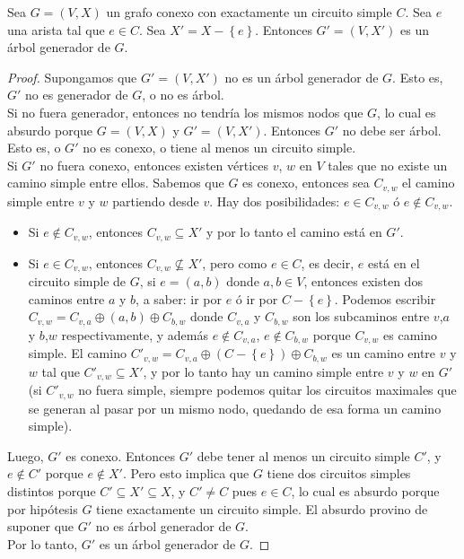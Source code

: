 \begin{lema}
\label{lema_ej3}
Sea $G = (V,X)$ un grafo conexo con exactamente un circuito simple $C$. Sea $e$ una arista tal que $e \in C$. Sea $X' = X - \left\{e\right\}$. Entonces $G' = (V,X')$ es un árbol generador de $G$.
\end{lema}
\begin{proof}
Supongamos que $G' = (V,X')$ no es un árbol generador de $G$. Esto es, $G'$ no es generador de $G$, o no es árbol. \\
Si no fuera generador, entonces no tendría los mismos nodos que $G$, lo cual es absurdo porque $G = (V,X)$ y $G' = (V,X')$.
Entonces $G'$ no debe ser árbol. Esto es, o $G'$ no es conexo, o tiene al menos un circuito simple. \\
Si $G'$ no fuera conexo, entonces existen vértices $v$, $w$ en $V$ tales que no existe un camino simple entre ellos. Sabemos que $G$ es conexo, entonces sea $C_{v,w}$ el camino simple entre $v$ y $w$ partiendo desde $v$. Hay dos posibilidades: $e \in C_{v,w}$ ó $e \notin C_{v,w}$. 
\begin{itemize}
\item Si $e \notin C_{v,w}$, entonces $C_{v,w} \subseteq X'$ y por lo tanto el camino está en $G'$. 
\item Si $e \in C_{v,w}$, entonces $C_{v,w} \not\subseteq X'$, pero como $e \in C$, es decir, $e$ está en el circuito simple de $G$, si $e = (a,b)$ donde $a, b \in V$, entonces existen dos caminos entre $a$ y $b$, a saber: ir por $e$ ó ir por $C - \left\{e\right\}$. Podemos escribir $C_{v,w} = C_{v,a} \oplus (a,b) \oplus C_{b,w}$ donde $C_{v,a}$ y $C_{b,w}$ son los subcaminos entre $v$,$a$ y $b$,$w$ respectivamente, y además $e \notin C_{v,a}$, $e \notin C_{b,w}$ porque $C_{v,w}$ es camino simple. El camino $C'_{v,w} = C_{v,a} \oplus (C - \left\{e\right\}) \oplus C_{b,w}$ es un camino entre $v$ y $w$ tal que $C'_{v,w} \subseteq X'$, y por lo tanto hay un camino simple entre $v$ y $w$ en $G'$ (si $C'_{v,w}$ no fuera simple, siempre podemos quitar los circuitos maximales que se generan al pasar por un mismo nodo, quedando de esa forma un camino simple).
\end{itemize}
Luego, $G'$ es conexo. Entonces $G'$ debe tener al menos un circuito simple $C'$, y $e \notin C'$ porque $e \notin X'$. Pero esto implica que $G$ tiene dos circuitos simples distintos porque $C' \subseteq X' \subseteq X$, y $C' \neq C$ pues $e \in C$, lo cual es absurdo porque por hipótesis $G$ tiene exactamente un circuito simple. El absurdo provino de suponer que $G'$ no es árbol generador de $G$. \\ Por lo tanto, $G'$ es un árbol generador de $G$.
\end{proof}


